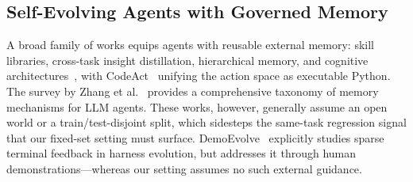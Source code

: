 
\subsection{Self-Evolving Agents with Governed Memory}
\label{sec:rw_self_evolving}

A broad family of works equips agents with reusable external memory: skill libraries, cross-task insight distillation, hierarchical memory, and cognitive architectures~\cite{wang2023voyager,zhao2024expel,packer2023memgpt,sumers2023cognitive}, with CodeAct~\cite{wang2024executable} unifying the action space as executable Python. The survey by Zhang et al.~\cite{zhang2024memory} provides a comprehensive taxonomy of memory mechanisms for LLM agents. These works, however, generally assume an open world or a train/test-disjoint split, which sidesteps the same-task regression signal that our fixed-set setting must surface. DemoEvolve~\cite{demoevolve2026} explicitly studies sparse terminal feedback in harness evolution, but addresses it through human demonstrations—whereas our setting assumes no such external guidance.

